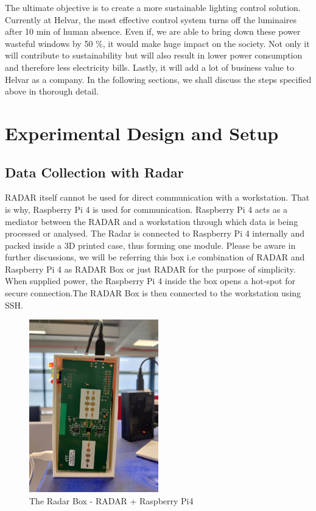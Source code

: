 The ultimate objective is to create a more sustainable lighting control solution. Currently at Helvar, the most effective control system turns off the luminaires after 10 min of human absence. Even if, we are able to bring down these power wasteful windows by 50 \%, it would make huge impact on the society. Not only it will contribute to sustainability but will also result in lower power consumption and therefore less electricity bills. Lastly, it will add a lot of business value to Helvar as a company. In the following sections, we shall discuss the steps specified above in thorough detail.

\section{Experimental Design and Setup}

\subsection{Data Collection with Radar}
RADAR itself cannot be used for direct communication with a workstation. That is why, Raspberry Pi 4 is used for communication. Raspberry Pi 4 acts as a mediator between the RADAR and a workstation through which data is being processed or analysed. 
The Radar is connected to Raspberry Pi 4 internally and packed inside a 3D printed case, thus forming one module. Please be aware in further discussions, we will be referring this box i.e combination of RADAR and Raspberry Pi 4 as RADAR Box or just RADAR for the purpose of simplicity. When supplied power, the Raspberry Pi 4 inside the box opens a hot-spot for secure connection.The RADAR Box is then connected to the workstation using SSH. 

\begin{figure}[ht]
  \begin{center}
    \includegraphics[width=0.5\textwidth]{Master's thesis/images/radar_int.jpg} 
    \caption{The Radar Box - RADAR + Raspberry Pi4 }
    \label{fig:AoA}
  \end{center}
\end{figure}  

